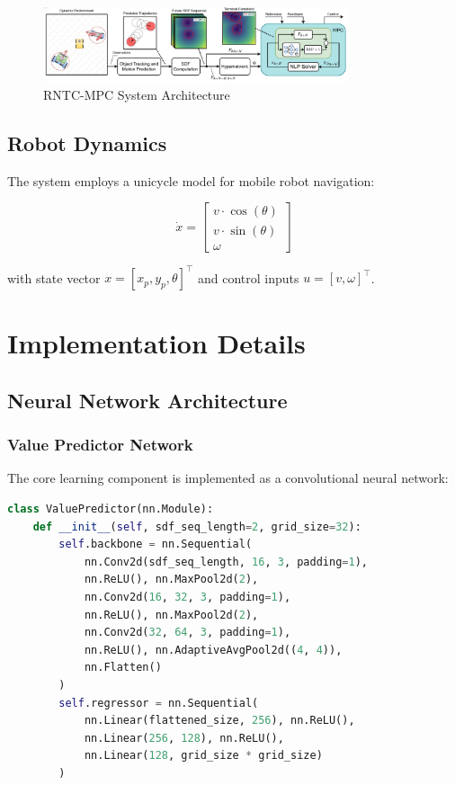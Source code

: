\documentclass[12pt,a4paper]{article}
\begin{document}
\begin{figure}[h!]
    \centering
    \includegraphics[width=0.8\textwidth]{system_architecture.png}
    \caption{RNTC-MPC System Architecture}
    \label{fig:architecture}
\end{figure}

\subsection{Robot Dynamics}
The system employs a unicycle model for mobile robot navigation:

\begin{equation}
\dot{x} = 
\begin{bmatrix}
v \cdot \cos(\theta) \\
v \cdot \sin(\theta) \\
\omega
\end{bmatrix}
\end{equation}

with state vector $x = [x_p, y_p, \theta]^\top$ and control inputs $u = [v, \omega]^\top$.

\section{Implementation Details}

\subsection{Neural Network Architecture}

\subsubsection{Value Predictor Network}
The core learning component is implemented as a convolutional neural network:

\begin{lstlisting}[language=Python, caption=Value Predictor Architecture]
class ValuePredictor(nn.Module):
    def __init__(self, sdf_seq_length=2, grid_size=32):
        self.backbone = nn.Sequential(
            nn.Conv2d(sdf_seq_length, 16, 3, padding=1),
            nn.ReLU(), nn.MaxPool2d(2),
            nn.Conv2d(16, 32, 3, padding=1),
            nn.ReLU(), nn.MaxPool2d(2),
            nn.Conv2d(32, 64, 3, padding=1),
            nn.ReLU(), nn.AdaptiveAvgPool2d((4, 4)),
            nn.Flatten()
        )
        self.regressor = nn.Sequential(
            nn.Linear(flattened_size, 256), nn.ReLU(),
            nn.Linear(256, 128), nn.ReLU(),
            nn.Linear(128, grid_size * grid_size)
        )
\end{lstlisting}
\end{document}
